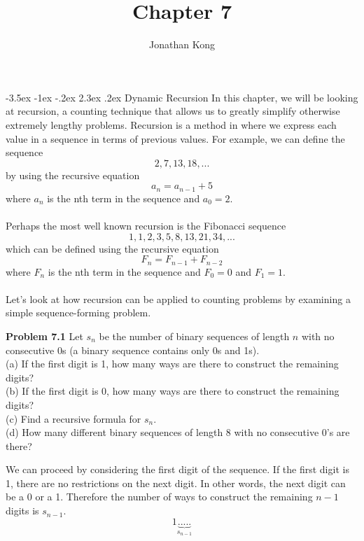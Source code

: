 \documentclass[11pt]{scrartcl}
\title{\normalfont\notesize\textbf{Chapter 7}}
\author{Jonathan Kong}
\date{}
\makeatletter
\renewcommand\section{\@startsection{section}{1}{\z@}%
                                   {-3.5ex \@plus -1ex \@minus -.2ex}%
                                   {2.3ex \@plus.2ex}%
                                   {\normalfont\large\bfseries}}
\makeatother
\begin{document}
\maketitle
\section{Dynamic Recursion}
In this chapter, we will be looking at recursion, a counting technique that allows us to greatly simplify otherwise extremely lengthy problems. Recursion is a method in where we express each value in a sequence in terms of previous values. For example, we can define the sequence 
$$2, 7, 13, 18,...$$
by using the recursive equation 
$${a_n}={a_{n-1}} +5$$
where $a_n$ is the nth term in the sequence and ${a_0}=2$. \\
\\
\noindent
Perhaps the most well known recursion is the Fibonacci sequence
$$1,1,2,3,5,8,13,21,34,...$$
which can be defined using the recursive equation 
$$F_{n}=F_{n-1}+F_{n-2}$$
where $F_n$ is the nth term in the sequence and $F_{0}=0$ and $F_{1}=1$. \\
\\
\noindent
Let's look at how recursion can be applied to counting problems by examining a simple sequence-forming problem. 
\\
\begin{tcolorbox}
\textbf{Problem 7.1} Let $s_n$ be the number of binary sequences of length $n$ with no consecutive 0s (a binary sequence contains only 0s and 1s). \\
(a) If the first digit is 1, how many ways are there to construct the remaining digits?\\
(b) If the first digit is 0, how many ways are there to construct the remaining digits? \\
(c) Find a recursive formula for $s_n$. \\
(d) How many different binary sequences of length 8 with no consecutive 0's are there?
\end{tcolorbox}
\noindent 
We can proceed by considering the first digit of the sequence. If the first digit is 1, there are no restrictions on the next digit. In other words, the next digit can be a 0 or a 1. Therefore the number of ways to construct the remaining $n-1$ digits is $s_{n-1}$. 
$$1{\underbrace{.....}_{s_{n-1}}}$$
\end{document}
